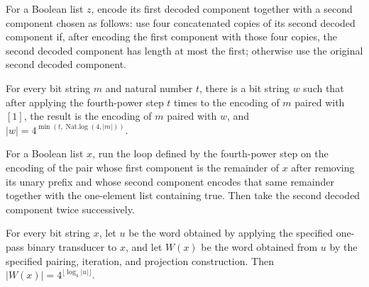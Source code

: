\begin{definition}
\label{Randomized.pow4Step}
\leanok
{}
For a Boolean list $z$, encode its first decoded component together with a second
component chosen as follows: use four concatenated copies of its second decoded
component if, after encoding the first component with those four copies, the second
decoded component has length at most the first; otherwise use the original second
decoded component.
\end{definition}

\begin{theorem}
\label{Randomized.iterate_pow4Step}
\leanok
{}
For every bit string $m$ and natural number $t$, there is a bit string $w$ such that
after applying the fourth-power step $t$ times to the encoding of $m$ paired with
$[1]$, the result is the encoding of $m$ paired with $w$, and
$|w|=4^{\min(t,\operatorname{Nat.log}(4,|m|))}$.
\end{theorem}

\begin{definition}
\label{Randomized.hlDWord}
\leanok
{}
For a Boolean list $x$, run the loop defined by the fourth-power step on the encoding of
the pair whose first component is the remainder of $x$ after removing its unary prefix
and whose second component encodes that same remainder together with the one-element
list containing true. Then take the second decoded component twice successively.
\end{definition}

\begin{theorem}
\label{Randomized.length_hlDWord}
\leanok
{}
For every bit string $x$, let $u$ be the word obtained by applying the specified
one-pass binary transducer to $x$, and let $W(x)$ be the word obtained from $u$ by the
specified pairing, iteration, and projection construction. Then $|W(x)|=4^{\lfloor\log_4
|u|\rfloor}$.
\end{theorem}


